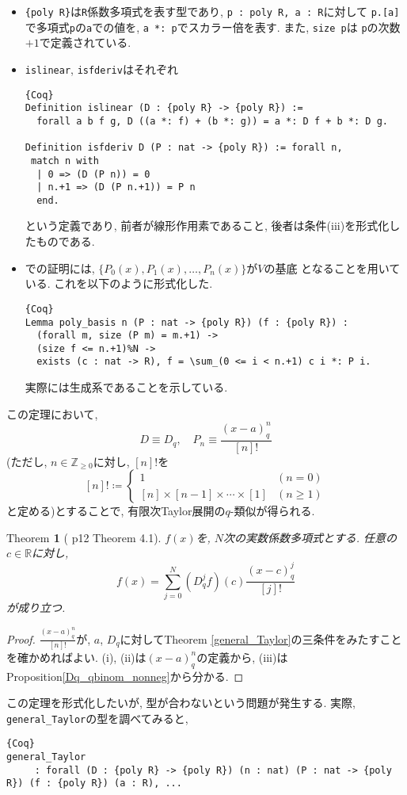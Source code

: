 \documentclass[11pt]{jarticle}
\theoremstyle{mystyle}
\newtheorem{thm}[df]{$\textrm{Theorem}$}
\newcommand{\bthm}{\begin{shadebox} \begin{thm}}
\newcommand{\ethm}{\end{thm} \end{shadebox}}
\newcommand{\bpf}{\begin{proof}}
\newcommand{\epf}{\end{proof}}
\newcommand{\Z}{\mathbb{Z}}
\newcommand{\R}{\mathbb{R}}
\newcommand{\0}{\textbf{0}}
\newcommand{\1}{\textbf{1}}
\newcommand{\2}{\textbf{2}}
\begin{document}
\begin{itemize}
  \item {\tt \{poly R\}}は{\tt R}係数多項式を表す型であり, {\tt p : {poly R}, a : R}に対して
  {\tt p.[a]}で多項式{\tt p}の{\tt a}での値を, {\tt a *: p}でスカラー倍を表す. また, {\tt size p}は
  {\tt p}の次数$+ 1$で定義されている. 
  \item {\tt islinear}, {\tt isfderiv}はそれぞれ
    \begin{lstlisting}{Coq}
Definition islinear (D : {poly R} -> {poly R}) :=
  forall a b f g, D ((a *: f) + (b *: g)) = a *: D f + b *: D g.

Definition isfderiv D (P : nat -> {poly R}) := forall n,
 match n with
  | 0 => (D (P n)) = 0
  | n.+1 => (D (P n.+1)) = P n
  end. \end{lstlisting}
    という定義であり, 前者が線形作用素であること, 後者は条件(iii)を形式化したものである. 
  \item \cite{Kac}での証明には, $\{P_0(x), P_1(x), \ldots , P_n(x)\}$が$V$の基底
    となることを用いている. これを以下のように形式化した. 
    \begin{lstlisting}{Coq}
Lemma poly_basis n (P : nat -> {poly R}) (f : {poly R}) :
  (forall m, size (P m) = m.+1) ->
  (size f <= n.+1)%N ->
  exists (c : nat -> R), f = \sum_(0 <= i < n.+1) c i *: P i. \end{lstlisting}
    実際には生成系であることを示している. 
\end{itemize}
この定理において, 
\[
  D \equiv D_q, \quad P_n \equiv \frac{(x-a)^n_q}{[n]!}
\]
(ただし, $n\in\Z_{\ge0}$に対し, $[n]!$を
\[
    [n]! \coloneqq \begin{cases}
                          1 & (n=0)\\
                          [n]\times[n-1]\times\cdots\times[1] & (n\ge1)
                        \end{cases}
\]
と定める)とすることで, 有限次Taylor展開の$q$-類似が得られる. 
\bthm[\cite{Kac} p12 Theorem 4.1] \label{q_Taylor}
$f(x)$を, $N$次の実数係数多項式とする. 任意の$c\in\R$に対し, 
  \[
    f(x) = \sum_{j=0}^N (D_q^jf)(c)\frac{(x-c)^j_q}{[j]!}
  \]
が成り立つ. 
\ethm
\bpf
$\frac{(x-a)^n_q}{[n]!}$が, $a$, $D_q$に対してTheorem \ref{general_Taylor}の三条件をみたすことを確かめればよい. (i), (ii)は$(x-a)^n_q$の定義から, (iii)はProposition\ref{Dq_qbinom_nonneg}から分かる. 
\epf
この定理を形式化したいが, 型が合わないという問題が発生する. 実際, {\tt general\_Taylor}の型を調べてみると, 
\begin{lstlisting}{Coq}
general_Taylor
     : forall (D : {poly R} -> {poly R}) (n : nat) (P : nat -> {poly R}) (f : {poly R}) (a : R), ...\end{lstlisting}
\end{document}
